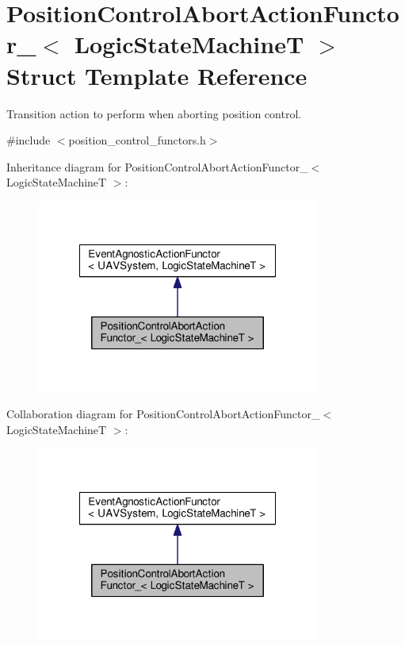 \hypertarget{structPositionControlAbortActionFunctor__}{\section{Position\-Control\-Abort\-Action\-Functor\-\_\-$<$ Logic\-State\-Machine\-T $>$ Struct Template Reference}
\label{structPositionControlAbortActionFunctor__}
}


Transition action to perform when aborting position control.  




{\ttfamily \#include $<$position\-\_\-control\-\_\-functors.\-h$>$}



Inheritance diagram for Position\-Control\-Abort\-Action\-Functor\-\_\-$<$ Logic\-State\-Machine\-T $>$\-:\nopagebreak
\begin{figure}[H]
\begin{center}
\leavevmode
\includegraphics[width=264pt]{structPositionControlAbortActionFunctor____inherit__graph}
\end{center}
\end{figure}


Collaboration diagram for Position\-Control\-Abort\-Action\-Functor\-\_\-$<$ Logic\-State\-Machine\-T $>$\-:\nopagebreak
\begin{figure}[H]
\begin{center}
\leavevmode
\includegraphics[width=264pt]{structPositionControlAbortActionFunctor____coll__graph}
\end{center}
\end{figure}
